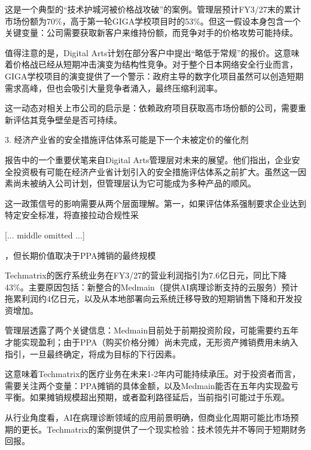 \documentclass[11pt]{ctexart}
\begin{document}
这是一个典型的“技术护城河被价格战攻破”的案例。管理层预计FY3/27末的累计市场份额为70\%，高于第一轮GIGA学校项目时的53\%。但这一假设本身包含一个关键变量：公司需要获取新客户来维持份额，而竞争对手的价格攻势可能持续。

值得注意的是，Digital Arts计划在部分客户中提出“略低于常规”的报价。这意味着价格战已经从短期冲击演变为结构性竞争。对于整个日本网络安全行业而言，GIGA学校项目的演变提供了一个警示：政府主导的数字化项目虽然可以创造短期需求高峰，但也会吸引大量竞争者涌入，最终压缩利润率。

这一动态对相关上市公司的启示是：依赖政府项目获取高市场份额的公司，需要重新评估其竞争壁垒是否可持续。

3. 经济产业省的安全措施评估体系可能是下一个未被定价的催化剂

报告中的一个重要伏笔来自Digital Arts管理层对未来的展望。他们指出，企业安全投资极有可能在经济产业省计划引入的安全措施评估体系之前扩大。虽然这一因素尚未被纳入公司计划，但管理层认为它可能成为多种产品的顺风。

这一政策信号的影响需要从两个层面理解。第一，如果评估体系强制要求企业达到特定安全标准，将直接拉动合规性采

[... middle omitted ...]

，但长期价值取决于PPA摊销的最终规模

Techmatrix的医疗系统业务在FY3/27的营业利润指引为7.6亿日元，同比下降43\%。主要原因包括：新整合的Medmain（提供AI病理诊断支持的云服务）预计拖累利润约4亿日元，以及从本地部署向云系统迁移导致的短期销售下降和开发投资增加。

管理层透露了两个关键信息：Medmain目前处于前期投资阶段，可能需要约五年才能实现盈利；由于PPA（购买价格分摊）尚未完成，无形资产摊销费用未纳入指引，一旦最终确定，将成为目标的下行因素。

这意味着Techmatrix的医疗业务在未来1-2年内可能持续承压。对于投资者而言，需要关注两个变量：PPA摊销的具体金额，以及Medmain能否在五年内实现盈亏平衡。如果摊销规模超出预期，或者盈利路径延后，当前指引可能过于乐观。

从行业角度看，AI在病理诊断领域的应用前景明确，但商业化周期可能比市场预期的更长。Techmatrix的案例提供了一个现实检验：技术领先并不等同于短期财务回报。
\end{document}
